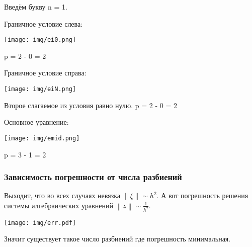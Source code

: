 Введём букву n = 1.

Граничное условие слева:
\begin{center}
  \texttt{[image: img/ei0.png]}
\end{center}
p = 2 - 0 = 2

Граничное условие справа:
\begin{center}
  \texttt{[image: img/eiN.png]}
\end{center}
Второе слагаемое из условия равно нулю.
p = 2 - 0 = 2

Основное уравнение:
\begin{center}
  \texttt{[image: img/emid.png]}
\end{center}
p = 3 - 1 = 2

\subsubsection{Зависимость погрешности от числа разбиений}

Выходит, что во всех случаях невязка $\left\lVert \xi \right\rVert \sim h^2$. А вот  погрешность решения системы алгебраических уравнений $ \left\lVert z \right\rVert \sim \frac{1}{h^2} $.
\begin{center}
  \texttt{[image: img/err.pdf]}
\end{center}

Значит существует такое число разбиений где погрешность минимальная.
